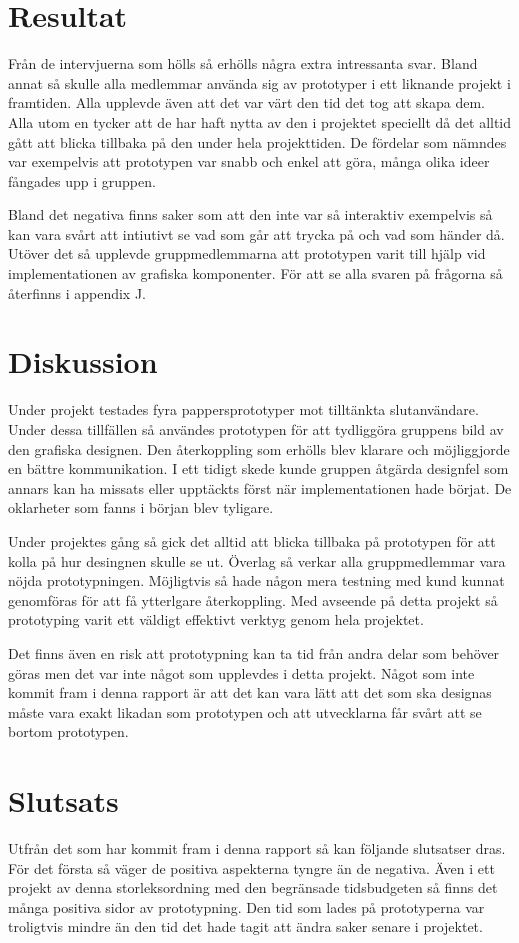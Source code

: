 \section{Resultat}
Från de intervjuerna som hölls så erhölls några extra intressanta svar. Bland annat så skulle alla medlemmar använda sig av prototyper i ett liknande projekt i framtiden. Alla upplevde även att det var värt den tid det tog att skapa dem. Alla utom en tycker att de har haft nytta av den i projektet speciellt då det alltid gått att blicka tillbaka på den under hela projekttiden. De fördelar som nämndes var exempelvis att prototypen var snabb och enkel att göra, många olika ideer fångades upp i gruppen. 

Bland det negativa finns saker som att den inte var så interaktiv exempelvis så kan vara svårt att intiutivt se vad som går att trycka på och  vad som händer då. Utöver det så upplevde gruppmedlemmarna att prototypen varit till hjälp vid implementationen av grafiska komponenter. För att se alla svaren på frågorna så återfinns i appendix J.  
  
\section{Diskussion}
Under projekt testades fyra pappersprototyper mot tilltänkta slutanvändare. Under dessa tillfällen så användes prototypen för att tydliggöra gruppens bild av den grafiska designen. Den återkoppling som erhölls blev klarare och möjliggjorde en bättre kommunikation. I ett tidigt skede kunde gruppen åtgärda designfel som annars kan ha missats eller upptäckts först när implementationen hade börjat. De oklarheter som fanns i början blev tyligare. 

Under projektes gång så gick det alltid att blicka tillbaka på prototypen för att kolla på hur desingnen skulle se ut. Överlag så verkar alla gruppmedlemmar vara nöjda prototypningen. Möjligtvis så hade någon mera testning med kund kunnat genomföras för att få ytterlgare återkoppling. Med avseende på detta projekt så prototyping varit ett väldigt effektivt verktyg genom hela projektet. 

Det finns även en risk att prototypning kan ta tid från andra delar som behöver göras men det var inte något som upplevdes i detta projekt. Något som inte kommit fram i denna rapport är att det kan vara lätt att det som ska designas måste vara exakt likadan som prototypen och att utvecklarna får svårt att se bortom prototypen.       

\section{Slutsats}
Utfrån det som har kommit fram i denna rapport så kan följande slutsatser dras. För det första så väger de positiva aspekterna tyngre än de negativa. Även i ett projekt av denna storleksordning med den begränsade tidsbudgeten så finns det många positiva sidor av prototypning. Den tid som lades på prototyperna var troligtvis mindre än den tid det hade tagit att ändra saker senare i projektet. 

